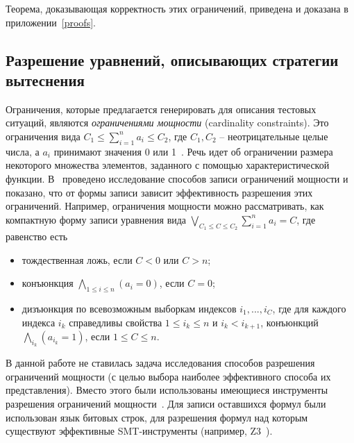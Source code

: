 \documentclass[14pt]{extreport}
\begin{document}

Теорема, доказывающая корректность этих ограничений, приведена и доказана в приложении~\ref{proofs}.


\subsection{Разрешение уравнений, описывающих стратегии вытеснения}

Ограничения, которые предлагается генерировать для описания тестовых ситуаций, являются \emph{ограничениями мощности} (cardinality constraints). Это ограничения вида $C_1 \leqslant \sum_{i=1}^n a_i \leqslant C_2$, где $C_1, C_2$ -- неотрицательные целые числа, а $a_i$ принимают значения 0 или 1~\cite{smt_debugging, PiskacK08, KuncakR07,
Revesz05}. Речь идет об ограничении размера некоторого множества
элементов, заданного с помощью характеристической функции.
В~\cite{smt_debugging} проведено исследование способов записи
ограничений мощности и показано, что от формы записи зависит
эффективность разрешения этих ограничений. Например, ограничения
мощности можно рассматривать, как компактную форму записи уравнения
вида $\bigvee_{C_1 \leqslant C \leqslant C_2} \sum_{i=1}^n a_i = C$,
где равенство есть
\begin{itemize}
\item тождественная ложь, если $C < 0$ или $C > n$;
\item конъюнкция $\bigwedge_{1\leqslant i\leqslant n} (a_i = 0)$,
если $C = 0$;
\item дизъюнкция по всевозможным выборкам индексов $i_1, ..., i_C$, где
для каждого индекса $i_k$ справедливы свойства $1 \leqslant i_k
\leqslant n$ и $i_k < i_{k+1}$, конъюнкций $\bigwedge_{i_k} (a_{i_k}
= 1)$, если $1 \leqslant C \leqslant n$.
\end{itemize}

В данной работе не ставилась задача исследования способов разрешения ограничений мощности (с целью выбора наиболее эффективного способа их представления). Вместо этого были использованы
имеющиеся инструменты разрешения ограничений мощности~\cite{Z3, Yices}. Для записи оставшихся формул были использован язык битовых строк, для разрешения формул над которым существуют эффективные SMT-инструменты (например, Z3~\cite{Z3}).
\end{document}
